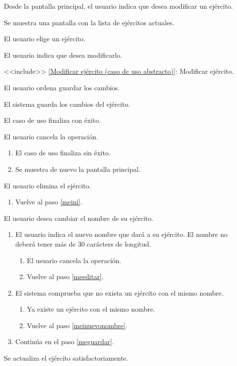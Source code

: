 {
  \item Desde la pantalla principal, el usuario indica que desea modificar un ejército.
  \item Se muestra una pantalla con la lista de ejércitos actuales.
  \item El usuario elige un ejército. \label{meini}
  \item El usuario indica que desea modificarlo. \label{memodificar}
  \item <<include>> \ref{Modificar ejército (caso de uso abstracto)}: Modificar ejército. \label{meeditar}
  \item El usuario ordena guardar los cambios. \label{mefin}
  \item El sistema guarda los cambios del ejército. \label{meguardar}
  \item El caso de uso finaliza con éxito.
}
{
  \item[\ref{meini}-\ref{mefin}:] El usuario cancela la operación.
    \begin{enumerate}
    \item El caso de uso finaliza sin éxito.
    \item Se muestra de nuevo la pantalla principal.
    \end{enumerate}
  \item[\ref{memodificar}:] El usuario elimina el ejército.
    \begin{enumerate}
    \item Vuelve al paso \ref{meini}.
    \end{enumerate}
  \item[\ref{mefin}:] El usuario desea cambiar el nombre de su ejército.
    \begin{enumerate}
    \item El usuario indica el nuevo nombre que dará a su ejército. El nombre no deberá tener más de 30 carácters de longitud.\label{meinuevonombre} 
      \begin{enumerate}
      \item El usuario cancela la operación.
      \item Vuelve al paso \ref{meeditar}.
      \end{enumerate}
    \item El sistema comprueba que no exista un ejército con el mismo nombre.
      \begin{enumerate}
      \item Ya existe un ejército con el mismo nombre.
      \item Vuelve al paso \ref{meinuevonombre}.
      \end{enumerate}
    \item Continúa en el paso \ref{meguardar}.
    \end{enumerate}
}{Se actualiza el ejército satisfactoriamente.}